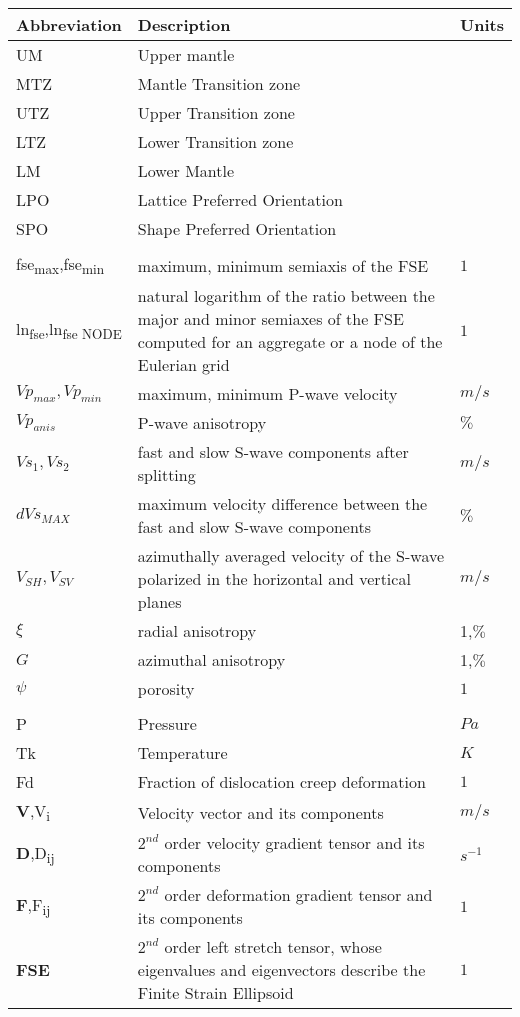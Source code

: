 \documentclass[a4paper,oneside,12pt]{book}
\begin{document}
\begin{table}[ht!]
\small
\begin{tabular}{lp{11cm}l}
\\
\hline
Abbreviation&Description&Units\\
\hline
UM&Upper mantle\\
MTZ&Mantle Transition zone\\
UTZ&Upper Transition zone\\
LTZ&Lower Transition zone\\
LM&Lower Mantle\\
LPO&Lattice Preferred Orientation\\
SPO&Shape Preferred Orientation\\
\\
fse\textsubscript{max},fse\textsubscript{min}&maximum, minimum semiaxis of the FSE&$1$\\
ln\textsubscript{fse},ln\textsubscript{fse NODE}&natural logarithm of the ratio between the major and minor semiaxes of the FSE computed for an aggregate or a node of the Eulerian grid&$1$\\
$Vp_{max},Vp_{min}$&maximum, minimum P-wave velocity&$m/s$\\
$Vp_{anis}$&P-wave anisotropy&$\%$\\
$Vs_{1},Vs_2$&fast and slow S-wave components after splitting&$m/s$\\
$dVs_{MAX}$&maximum velocity difference between the fast and slow S-wave components&$\%$\\
$V_{SH},V_{SV}$&azimuthally averaged velocity of the S-wave polarized in the horizontal and vertical planes&$m/s$\\
$\xi$&radial anisotropy&1,$\%$\\
$G$&azimuthal anisotropy&1,$\%$\\
$\psi$&porosity&$1$\\
\\
P&Pressure &$Pa$\\
Tk&Temperature &$K$\\
Fd&Fraction of dislocation creep deformation &$1$\\
\textbf{V},V\textsubscript{i}&Velocity vector and its components&$m/s$\\
\textbf{D},D\textsubscript{ij}&$2^{nd}$ order velocity gradient tensor and its components&$s^{-1}$\\
\textbf{F},F\textsubscript{ij}&$2^{nd}$ order deformation gradient tensor and its components&$1$\\
\textbf{FSE} &$2^{nd}$ order left stretch tensor, whose eigenvalues and eigenvectors describe the Finite Strain Ellipsoid &$1$\\

\end{tabular}
\end{table}
\end{document}
